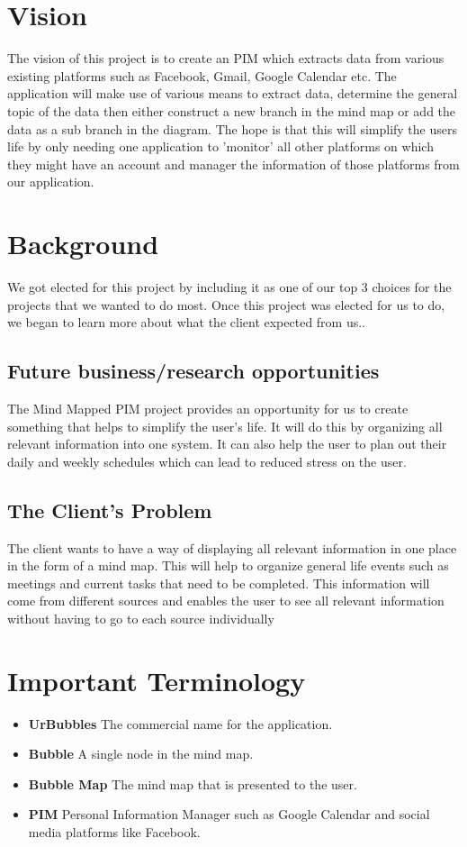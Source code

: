 \documentclass[hidelinks,english]{article}
\begin{document}
	
	\section{Vision}
	The vision of this project is to create an PIM which extracts data from various existing platforms such as Facebook, Gmail, Google Calendar etc. The application will make use of various means to extract data, determine the general topic of the data then either construct a new branch in the mind map or add the data as a sub branch in the diagram. The hope is that this will simplify the users life by only needing one application to 'monitor' all other platforms on which they might have an account and manager the information of those platforms from our application.
	
	\section{Background}
		We got elected for this project by including it as one of our top 3 choices for the projects that we wanted to do most. Once this project was elected for us to do, we began to learn more about what the client expected from us..

		\subsection{Future business/research opportunities}
		The Mind Mapped PIM project provides an opportunity for us to create something that helps to simplify the user's life. It will do this by organizing all relevant information into one system. It can also help the user to plan out their daily and weekly schedules which can lead to reduced stress on the user.
		
		\subsection{The Client's Problem}
		The client wants to have a way of displaying all relevant information in one place in the form of a mind map. This will help to organize general life events such as meetings and current tasks that need to be completed. This information will come from different sources and enables the user to see all relevant information without having to go to each source individually
		
	\section{Important Terminology}
		\begin{itemize}
			\item \textbf{UrBubbles} The commercial name for the application.
			\item \textbf{Bubble} A single node in the mind map.
			\item \textbf{Bubble Map} The mind map that is presented to the user.
			\item \textbf{PIM} Personal Information Manager such as Google Calendar and social media platforms like Facebook.
		\end{itemize}
	
\end{document}

